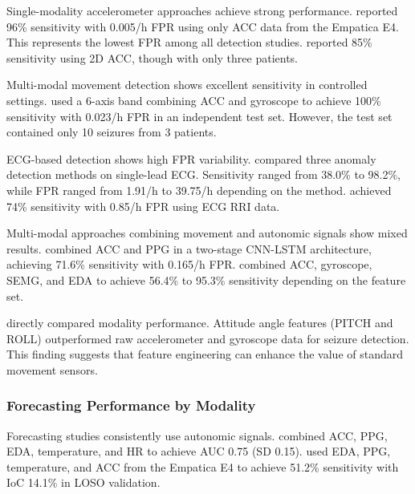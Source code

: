 Single-modality accelerometer approaches achieve strong performance. \textcite{spahrDeepLearningbasedDetection2025} reported 96\% sensitivity with 0.005/h FPR using only ACC data from the Empatica E4. This represents the lowest FPR among all detection studies. \textcite{borujenyDetectionEpilepticSeizure2013} reported 85\% sensitivity using 2D ACC, though with only three patients.

Multi-modal movement detection shows excellent sensitivity in controlled settings. \textcite{fineDetectionKeyAutomated2025} used a 6-axis band combining ACC and gyroscope to achieve 100\% sensitivity with 0.023/h FPR in an independent test set. However, the test set contained only 10 seizures from 3 patients.

ECG-based detection shows high FPR variability. \textcite{reintjesECGBasedDetectionEpileptic2025} compared three anomaly detection methods on single-lead ECG. Sensitivity ranged from 38.0\% to 98.2\%, while FPR ranged from 1.91/h to 39.75/h depending on the method. \textcite{odeDevelopmentEpilepticSeizure2023} achieved 74\% sensitivity with 0.85/h FPR using ECG RRI data.

Multi-modal approaches combining movement and autonomic signals show mixed results. \textcite{dongTwoLayerEnsembleMethod2022} combined ACC and PPG in a two-stage CNN-LSTM architecture, achieving 71.6\% sensitivity with 0.165/h FPR. \textcite{wangEpilepticSeizureDetection2025} combined ACC, gyroscope, SEMG, and EDA to achieve 56.4\% to 95.3\% sensitivity depending on the feature set.

\textcite{wangEpilepticSeizureDetection2025} directly compared modality performance. Attitude angle features (PITCH and ROLL) outperformed raw accelerometer and gyroscope data for seizure detection. This finding suggests that feature engineering can enhance the value of standard movement sensors.

\subsubsection{Forecasting Performance by Modality}

Forecasting studies consistently use autonomic signals. \textcite{nasseriAmbulatorySeizureForecasting2021} combined ACC, PPG, EDA, temperature, and HR to achieve AUC 0.75 (SD 0.15). \textcite{meiselMachineLearningWristband2020} used EDA, PPG, temperature, and ACC from the Empatica E4 to achieve 51.2\% sensitivity with IoC 14.1\% in LOSO validation.

